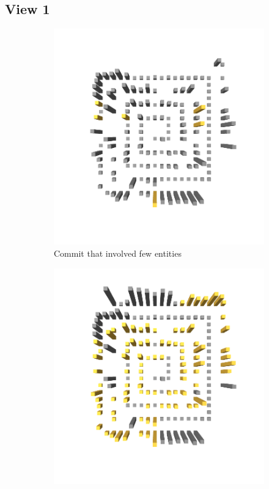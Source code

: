\subsection{View 1}
\begin{figure}[t!]
    \begin{subfigure}{0.42\textwidth}
        \includegraphics[width=\linewidth]{JetUML_V0E0.png}
        \caption{Commit that involved few entities} \label{fig:JetUML_V0E0}
    \end{subfigure}
    \hspace*{\fill}
    \begin{subfigure}{0.42\textwidth}
        \includegraphics[width=\linewidth]{JetUML_V0E1.png}

\end{subfigure}
\end{figure}
